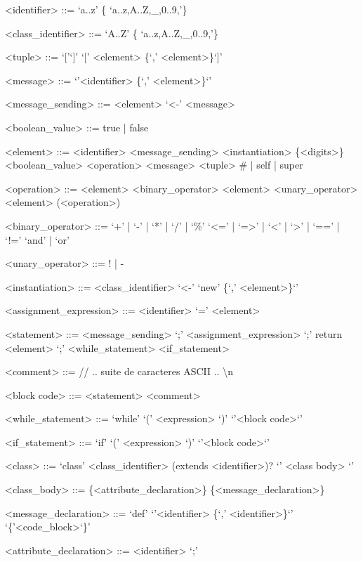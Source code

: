 \documentclass{eplDoc}
\begin{document}
\begin{grammar}
<identifier> ::= `a..z' \{ `a..z,A..Z,\_,0..9,'\} 

<class\_identifier> ::= `A..Z' \{ `a..z,A..Z,\_,0..9,'\} 

<tuple> ::= `['`]' \alt `[' <element> \{`,' <element>\}`]'

<message> ::= `{'<identifier> \{`,' <element>\}`}'

<message\_sending> ::= <element> `<-' <message>

<boolean\_value> ::= true | false

<element> ::= <identifier> 
\alt<message\_sending>
\alt<instantiation>
\alt \{<digits>\}
\alt <boolean\_value>
\alt <operation>
\alt <message>
\alt <tuple>
\alt \# | self | super

<operation> ::= <element> <binary\_operator> <element>
\alt <unary\_operator> <element>
\alt (<operation>)

<binary\_operator> ::= `+' | `-' | `*' | `/' | `\%' 
\alt `<=' | `=>' | `<' | `>' | `==' | `!=' 
\alt `and' | `or'

<unary\_operator> ::= ! | - 

<instantiation> ::= <class\_identifier> `<-' `{new' \{`,' <element>\}`}'


<assignment\_expression> ::= <identifier> `=' <element>

<statement> ::= <message\_sending> `;'
\alt <assignment\_expression> `;'
\alt return <element> `;'
\alt <while\_statement>
\alt <if\_statement>

<comment> ::= // .. suite de caracteres ASCII .. \textbackslash n

<block code> ::= { <statement> } { <comment> } 

<while\_statement> ::= `while' `(' <expression> `)'  `{'<block code>`}'

<if\_statement> ::= `if' `(' <expression> `)'  `{'<block code>`}'




<class> ::= `class' <class\_identifier> (extends <identifier>)? `{' <class body> `}'

<class\_body> ::= \{<attribute\_declaration>\} \{<message\_declaration>\}

<message\_declaration> ::= `def'  `{'<identifier> \{`,' <identifier>\}`}' `\{'<code\_block>`\}'

<attribute\_declaration> ::= <identifier> `;'

\end{grammar}
\end{document}
